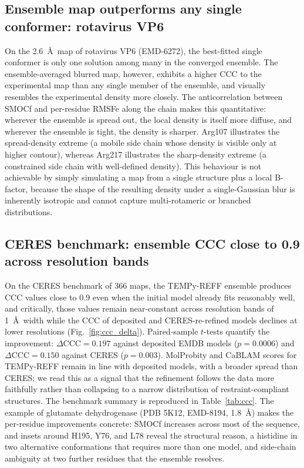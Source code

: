 \documentclass[11pt]{article}
\begin{document}
\subsection{Ensemble map outperforms any single conformer: rotavirus VP6}
On the 2.6~\AA\ map of rotavirus VP6 (EMD-6272), the best-fitted single conformer is only one solution among many in the converged ensemble. The ensemble-averaged blurred map, however, exhibits a higher CCC to the experimental map than any single member of the ensemble, and visually resembles the experimental density more closely. The anticorrelation between SMOCf and per-residue RMSFe along the chain makes this quantitative: wherever the ensemble is spread out, the local density is itself more diffuse, and wherever the ensemble is tight, the density is sharper. Arg107 illustrates the spread-density extreme (a mobile side chain whose density is visible only at higher contour), whereas Arg217 illustrates the sharp-density extreme (a constrained side chain with well-defined density). This behaviour is not achievable by simply simulating a map from a single structure plus a local B-factor, because the shape of the resulting density under a single-Gaussian blur is inherently isotropic and cannot capture multi-rotameric or branched distributions.

\subsection{CERES benchmark: ensemble CCC close to 0.9 across resolution bands}
On the CERES benchmark of 366 maps, the TEMPy-REFF ensemble produces CCC values close to 0.9 even when the initial model already fits reasonably well, and critically, those values remain near-constant across resolution bands of 1~\AA\ width while the CCC of deposited and CERES-re-refined models declines at lower resolutions (Fig.~\ref{fig:ccc_delta}). Paired-sample $t$-tests quantify the improvement: $\Delta\mathrm{CCC}=0.197$ against deposited EMDB models ($p=0.0006$) and $\Delta\mathrm{CCC}=0.150$ against CERES ($p=0.003$). MolProbity and CaBLAM scores for TEMPy-REFF remain in line with deposited models, with a broader spread than CERES; we read this as a signal that the refinement follows the data more faithfully rather than collapsing to a narrow distribution of restraint-compliant structures. The benchmark summary is reproduced in Table~\ref{tab:ccc}. The example of glutamate dehydrogenase (PDB 5K12, EMD-8194, 1.8~\AA) makes the per-residue improvements concrete: SMOCf increases across most of the sequence, and insets around H195, Y76, and L78 reveal the structural reason, a histidine in two alternative conformations that requires more than one model, and side-chain ambiguity at two further residues that the ensemble resolves.
\end{document}
